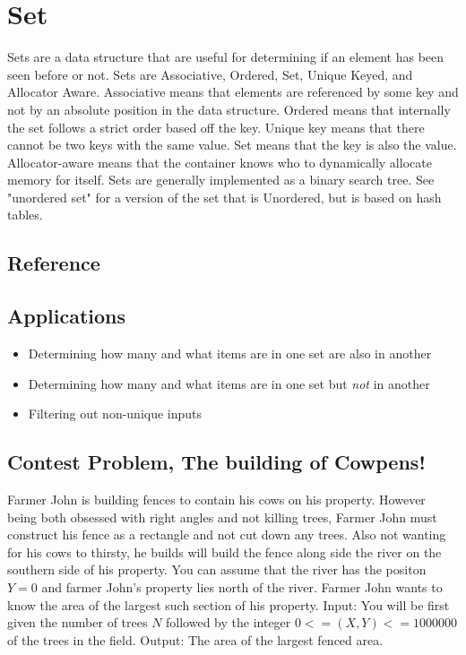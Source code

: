 \section{Set}
Sets are a data structure that are useful for determining if an element has been seen before or not.  Sets are Associative, Ordered, Set, Unique Keyed, and Allocator Aware\cite{cplusplus}.  Associative means that elements are referenced by some key and not by an absolute position in the data structure. Ordered means that internally the set follows a strict order based off the key.  Unique key means that there cannot be two keys with the same value.  Set means that the key is also the value. Allocator-aware means that the container knows who to dynamically allocate memory for itself.  Sets are generally implemented as a binary search tree.  See "unordered set" for a version of the set that is Unordered, but is based on hash tables.

\subsection{Reference}


\subsection{Applications}
\begin{itemize}
    \item   Determining how many and what items are in one set are also in another
    \item   Determining how many and what items are in one set but \emph{not} in another
    \item   Filtering out non-unique inputs
\end{itemize}

\subsection{Contest Problem, The building of Cowpens!}
Farmer John is building fences to contain his cows on his property.  However being both obsessed with right angles and not killing trees, Farmer John must construct his fence as a rectangle and not cut down any trees.  Also not wanting for his cows to thirsty, he builds will build the fence along side the river on the southern side of his property.  You can assume that the river has the positon $Y=0$ and farmer John's property lies north of the river.  Farmer John wants to know the area of the largest such section of his property.
Input: You will be first given the number of trees $N$ followed by the integer $0<=(X,Y) <= 1000000$ of the trees in the field. 
Output: The area of the largest fenced area.


